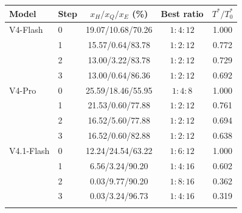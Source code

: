 \begin{tabular*}{\linewidth}{@{\extracolsep{\fill}}llccc@{}}\toprule
Model & Step & $x_H/x_Q/x_E$ (\%) & Best ratio & $T^*/T^*_0$ \\\midrule
V4-Flash & 0 & 19.07/10.68/70.26 & $1:4:12$ & 1.000 \\
 & 1 & 15.57/0.64/83.78 & $1:2:12$ & 0.772 \\
 & 2 & 13.00/3.22/83.78 & $1:2:12$ & 0.729 \\
 & 3 & 13.00/0.64/86.36 & $1:2:12$ & 0.692 \\
\addlinespace[2pt]
V4-Pro & 0 & 25.59/18.46/55.95 & $1:4:8$ & 1.000 \\
 & 1 & 21.53/0.60/77.88 & $1:2:12$ & 0.761 \\
 & 2 & 16.52/5.60/77.88 & $1:2:12$ & 0.694 \\
 & 3 & 16.52/0.60/82.88 & $1:2:12$ & 0.638 \\
\addlinespace[2pt]
V4.1-Flash & 0 & 12.24/24.54/63.22 & $1:6:12$ & 1.000 \\
 & 1 & 6.56/3.24/90.20 & $1:4:16$ & 0.602 \\
 & 2 & 0.03/9.77/90.20 & $1:8:16$ & 0.362 \\
 & 3 & 0.03/3.24/96.73 & $1:4:16$ & 0.319 \\
\addlinespace[2pt]
\bottomrule\end{tabular*}
